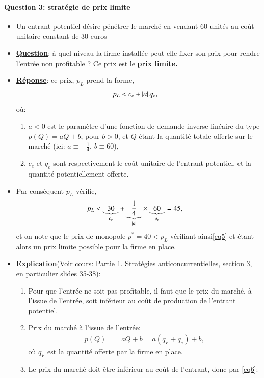 \documentclass[notes, ignorenonframetext, compress, 9pt, xcolor=svgnames, aspectratio=169]{beamer}
\begin{document}
\begin{frame}
[allowframebreaks]{\insertsection}
\framesubtitle{Question 3: stratégie de prix limite}
\begin{itemize}
\item Un entrant potentiel désire pénétrer le marché en vendant 60 unités au coût unitaire constant de 30 euros
\item \textbf{\underline{Question}}: à quel niveau la firme installée peut-elle fixer son prix
pour rendre l’entrée non profitable ? Ce prix est le \textbf{\underline{prix limite.}}
\item \textbf{\underline{Réponse}}: ce prix, $p_L$ prend la forme,
\begin{align}
p_L &< c_e + \left\vert {a} \right\vert q_e,
\label{eq4}
\end{align}
où:
\begin{enumerate}[$\cdot$]
\item $a<0$ est le paramètre d'une fonction de demande inverse linéaire du type $p(Q) = aQ + b$, pour $b>0$, et $Q$ étant la quantité totale offerte sur le marché
(ici: $a\equiv -\frac{1}{4}$, $b \equiv 60$),
\item $c_e$ et $q_e$ sont respectivement le coût unitaire de l'entrant potentiel, et la  quantité potentiellement offerte.
\end{enumerate}
\item Par conséquent $p_L$ vérifie,
\begin{align}
p_L &< \underbrace{30}_{c_e}+  \underbrace{\frac{1}{4}}_{\left\vert {a} \right\vert} \times \underbrace{60}_{q_e} = 45,
\label{eq5}
\end{align}
et on note que le prix de monopole $p^* = 40 < p_L$  vérifiant ainsi\eqref{eq5} et étant alors un prix limite possible pour la firme en place.
\item  \textbf{\underline{Explication}}(Voir cours: Partie 1. Stratégies anticoncurrentielles, section 3, en particulier slides 35-38):
\begin{enumerate}[$\cdot$]
\item Pour que l’entrée ne soit pas profitable, il faut que le prix du
marché, à l’issue de l’entrée, soit inférieur au coût de production de
l’entrant potentiel.
\item  Prix du marché à l’issue de l’entrée:
\begin{align}
p(Q) &= aQ + b = a(q_F + q_e ) + b,
\label{eq6}
\end{align}
où $q_F$ est la quantité offerte par la firme en place.
\item Le prix du marché doit être inférieur au coût de l’entrant, donc par \eqref{eq6}:

\end{enumerate}
\end{itemize}
\end{frame}
\end{document}
